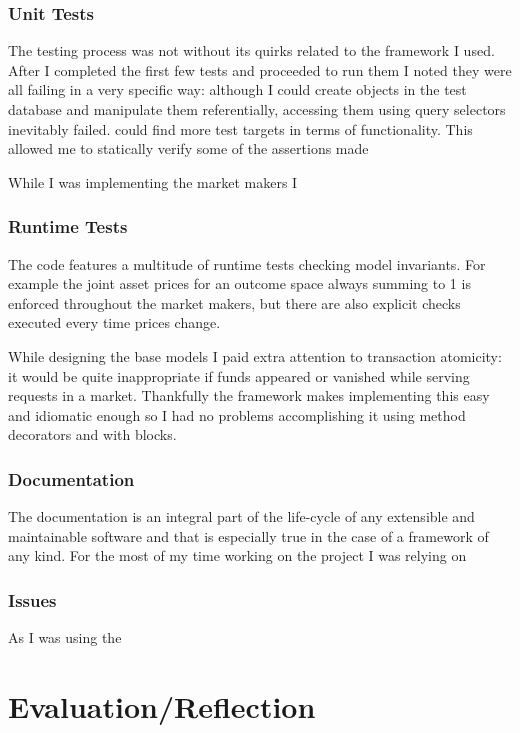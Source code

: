 \documentclass[bsc,frontabs,twoside,singlespacing,parskip,deptreport]{infthesis}     %
\begin{document}
\subsection{Unit Tests}

	The testing process was not without its quirks related to the framework I used. After I completed the first few tests and proceeded to run them I noted they were all failing in a very specific way: although I could create objects in the test database and manipulate them referentially, accessing them using query selectors inevitably failed. could find more test targets in terms of functionality. This allowed me to statically verify some of the assertions made 
	
	While I was implementing the market makers I 
	
\subsection{Runtime Tests}
    
    The code features a multitude of runtime tests checking model invariants. For example the joint asset prices for an outcome space always summing to 1 is enforced throughout the market makers, but there are also explicit checks executed every time prices change.

    While designing the base models I paid extra attention to transaction atomicity: it would be quite inappropriate if funds appeared or vanished while serving requests in a market. Thankfully the framework makes implementing this easy and idiomatic enough so I had no problems accomplishing it using method decorators and with blocks.

\subsection{Documentation}

    The documentation is an integral part of the life-cycle of any extensible and maintainable software and that is especially true in the case of a framework of any kind. For the most of my time working on the project I was relying on 
    
\subsection{Issues}
    As I was using the 
    
\chapter{Evaluation/Reflection}
\end{document}

